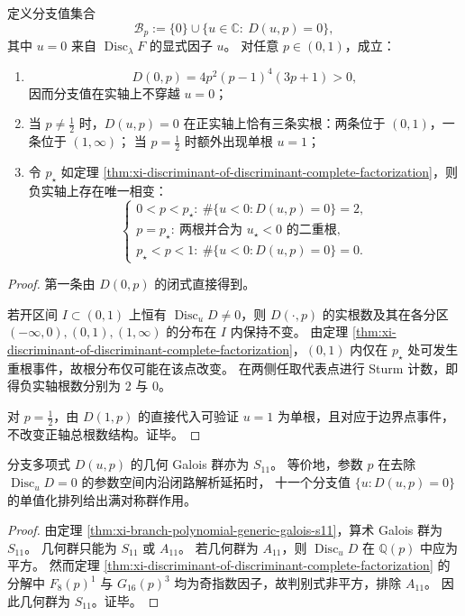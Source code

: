 \begin{theorem}[实分支值的全局拓扑与两相结构]\label{thm:xi-real-branch-topology-two-phase-structure}
定义分支值集合
\[
\mathcal B_p:=\{0\}\cup\{u\in\mathbb C:\ D(u,p)=0\},
\]
其中 \(u=0\) 来自 \(\operatorname{Disc}_{\lambda}F\) 的显式因子 \(u\)。
对任意 \(p\in(0,1)\)，成立：
\begin{enumerate}
  \item
  \[
  D(0,p)=4p^2(p-1)^4(3p+1)>0,
  \]
  因而分支值在实轴上不穿越 \(u=0\)；
  \item 当 \(p\neq\frac12\) 时，\(D(u,p)=0\) 在正实轴上恰有三条实根：两条位于 \((0,1)\)，一条位于 \((1,\infty)\)；
  当 \(p=\frac12\) 时额外出现单根 \(u=1\)；
  \item 令 \(p_\star\) 如定理 \ref{thm:xi-discriminant-of-discriminant-complete-factorization}，则负实轴上存在唯一相变：
  \[
  \begin{cases}
  0<p<p_\star:\ \#\{u<0:D(u,p)=0\}=2,\\
  p=p_\star:\ \text{两根并合为 }u_\star<0\text{ 的二重根},\\
  p_\star<p<1:\ \#\{u<0:D(u,p)=0\}=0.
  \end{cases}
  \]
\end{enumerate}
\end{theorem}
\begin{proof}
第一条由 \(D(0,p)\) 的闭式直接得到。

若开区间 \(I\subset(0,1)\) 上恒有 \(\operatorname{Disc}_uD\neq0\)，则 \(D(\cdot,p)\) 的实根数及其在各分区
\((-\infty,0),(0,1),(1,\infty)\) 的分布在 \(I\) 内保持不变。
由定理 \ref{thm:xi-discriminant-of-discriminant-complete-factorization}，\((0,1)\) 内仅在 \(p_\star\) 处可发生重根事件，故根分布仅可能在该点改变。
在两侧任取代表点进行 Sturm 计数，即得负实轴根数分别为 \(2\) 与 \(0\)。

对 \(p=\frac12\)，由 \(D(1,p)\) 的直接代入可验证 \(u=1\) 为单根，且对应于边界点事件，不改变正轴总根数结构。证毕。
\end{proof}

\begin{corollary}[分支值延拓的满对称单群作用]\label{cor:xi-full-symmetric-geometric-monodromy-s11}
分支多项式 \(D(u,p)\) 的几何 Galois 群亦为 \(S_{11}\)。
等价地，参数 \(p\) 在去除 \(\operatorname{Disc}_uD=0\) 的参数空间内沿闭路解析延拓时，
十一个分支值 \(\{u:D(u,p)=0\}\) 的单值化排列给出满对称群作用。
\end{corollary}
\begin{proof}
由定理 \ref{thm:xi-branch-polynomial-generic-galois-s11}，算术 Galois 群为 \(S_{11}\)。
几何群只能为 \(S_{11}\) 或 \(A_{11}\)。
若几何群为 \(A_{11}\)，则 \(\operatorname{Disc}_uD\) 在 \(\mathbb Q(p)\) 中应为平方。
然而定理 \ref{thm:xi-discriminant-of-discriminant-complete-factorization} 的分解中
\(
F_8(p)^1
\)
与
\(
G_{16}(p)^3
\)
均为奇指数因子，故判别式非平方，排除 \(A_{11}\)。
因此几何群为 \(S_{11}\)。证毕。
\end{proof}

\endinput

